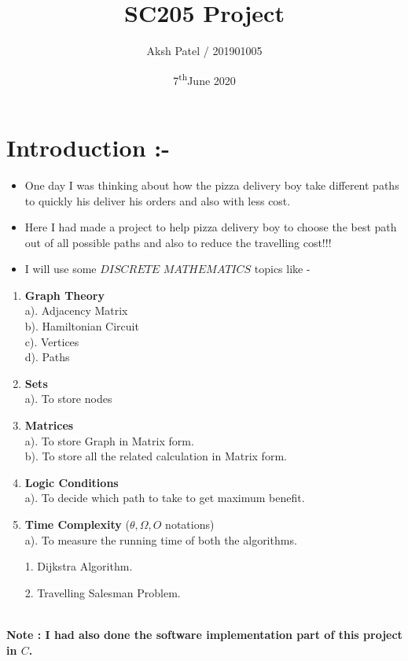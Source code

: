 \documentclass{article}
\title{SC205 Project}
\author{Aksh Patel / 201901005 }
\date{7\textsuperscript{th}June 2020}
\begin{document}
\maketitle

\section{Introduction :- }
\begin{itemize}
    \item One day I was thinking about how the pizza delivery boy take different paths to quickly his deliver his orders and also with less cost.
    \item Here I had made a project to help pizza delivery boy to choose the best path out of all possible paths and also to reduce the travelling cost!!!
    \item I will use some $DISCRETE$ $MATHEMATICS$ topics like -
\end{itemize}

\begin{enumerate}
    \item \textbf{Graph Theory} \\
        a). Adjacency Matrix \\
        b). Hamiltonian Circuit \\
        c). Vertices \\
        d). Paths
    \item \textbf{Sets}\\
        a). To store nodes
    \item \textbf{Matrices}\\
        a). To store Graph in Matrix form.\\
        b). To store all the related calculation in Matrix form.
    \item \textbf{Logic Conditions}\\
        a). To decide which path to take to get maximum benefit.
    \item \textbf{Time Complexity} ($\theta , \Omega , O$ notations)\\
        a). To measure the running time of both the algorithms.
        
            1. Dijkstra Algorithm.
            
            2. Travelling Salesman Problem.
\end{enumerate}
\\
\textbf{Note : I had also done the software implementation part of this project in $C$.}
\end{document}
